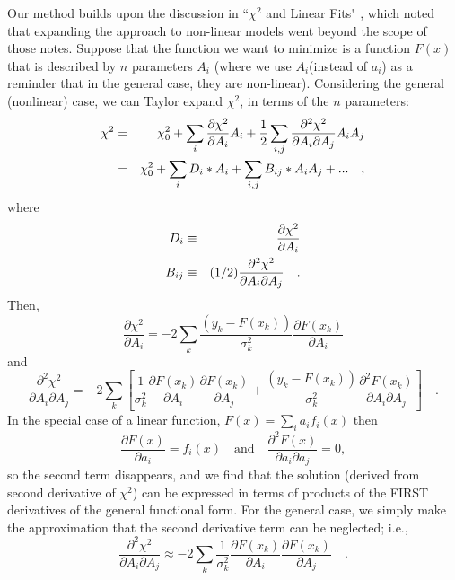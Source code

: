 \documentclass[preprint]{aastex631}
\begin{document}
Our method builds upon the discussion in ``$\chi^2$ and Linear Fits" \citep{Gould03}, which noted that expanding the approach to non-linear models went beyond the scope of those notes. Suppose that the function we want to minimize is a function $F(x)$ that is described by $n$ parameters $A_i$ (where we use $A_i $(instead of $a_i$) as a reminder that in the general
case, they are non-linear).
Considering
the general (nonlinear) case, we can Taylor expand $\chi^2$, in terms of the $n$ parameters:
\begin{eqnarray}
\chi^2 & = &  \chi^2_0 + \sum_i {\partial \chi^2\over \partial A_i} A_i
+ {1\over2}\sum_{i,j} {\partial^2 \chi^2\over \partial A_i \partial A_j}A_i A_j\\
& = & \chi^2_0 + \sum_i D_i * A_i + \sum_{i,j} B_{ij} * A_i A_j  + ... \quad,
\end{eqnarray}
where
\begin{eqnarray}
D_i  & \equiv & {\partial \chi^2\over \partial A_i} \label{eqn:d}\\
B_{ij} & \equiv & (1/2){\partial^2 \chi^2\over \partial A_i\partial A_j}  \quad. \label{eqn:b}
\end{eqnarray}
Then,
\begin{equation}
\frac{\partial \chi^2}{\partial A_i} = -2\sum_k \frac{(y_k - F(x_k))}{\sigma^2_k}\frac{\partial F(x_k)}{\partial A_i}
\end{equation}
and
\begin{equation}
\frac{\partial^2 \chi^2}{\partial A_i \partial A_j} = -2\sum_k \left[
 \frac{1}{\sigma^2_k}\frac{\partial F(x_k)}{\partial A_i}\frac{\partial F(x_k)}{\partial A_j} +
  \frac{(y_k - F(x_k))}{\sigma^2_k}\frac{\partial^2 F(x_k)}{\partial A_i \partial A_j}
 \right] \quad .
\end{equation}
In the special case of a linear function, $F(x) = \sum_i a_i f_i(x)$
then
\begin{equation}
\frac{\partial F(x)}{\partial a_i} = f_i(x)
\quad \mathrm{and} \quad
\frac{\partial^2 F(x)}{\partial a_i\partial a_j} = 0,
\end{equation}
so the second term disappears, and we find that the solution (derived from
second derivative of $\chi^2$) can be expressed
in terms of products of the FIRST derivatives of the general functional
form.  For the general case, we simply make the approximation that the second derivative term can be neglected; i.e.,
\begin{equation}
\frac{\partial^2 \chi^2}{\partial A_i \partial A_j} \approx -2\sum_k 
 \frac{1}{\sigma^2_k}\frac{\partial F(x_k)}{\partial A_i}\frac{\partial F(x_k)}{\partial A_j} \quad.
\end{equation}
\end{document}
